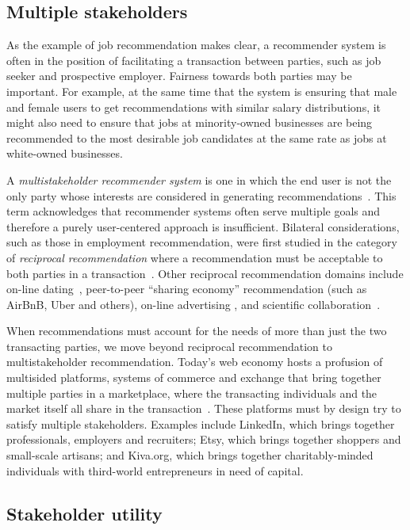 \subsection{Multiple stakeholders}

As the example of job recommendation makes clear, a recommender system is often in the position of facilitating a transaction between parties, such as job seeker and prospective employer. Fairness towards both parties may be important. For example, at the same time that the system is ensuring that male and female users to get recommendations with similar salary distributions, it might also need to ensure that jobs at minority-owned businesses are being recommended to the most desirable job candidates at the same rate as jobs at white-owned businesses.

A \textit{multistakeholder recommender system} is one in which the end user is not the only party whose interests are considered in generating recommendations~\cite{soappaper,abdollahpouri_recommender_2017}. This term acknowledges that recommender systems often serve multiple goals and therefore a purely user-centered approach is insufficient. Bilateral considerations, such as those in employment recommendation, were first studied in the category of \textit{reciprocal recommendation} where a recommendation must be acceptable to both parties in a transaction~\cite{akoglu_valuepick:_2010}. Other reciprocal recommendation domains include on-line dating~\cite{reciprocal}, peer-to-peer ``sharing economy'' recommendation (such as AirBnB, Uber and others), on-line advertising \cite{targetadvertisingbiding}, and scientific collaboration~\cite{lopes2010collaboration,tang2012cross}.

When recommendations must account for the needs of more than just the two transacting parties, we move beyond reciprocal recommendation to multistakeholder recommendation. Today's web economy hosts a profusion of multisided platforms, systems of commerce and exchange that bring together multiple parties in a marketplace, where the transacting individuals and the market itself all share in the transaction~\cite{evans_matchmakers:_2016}. These platforms must by design try to satisfy multiple stakeholders. Examples include LinkedIn, which brings together professionals, employers and recruiters; Etsy, which brings together shoppers and small-scale artisans; and Kiva.org, which brings together charitably-minded individuals with third-world entrepreneurs in need of capital. 

\subsection{Stakeholder utility}

